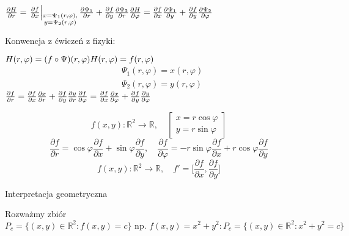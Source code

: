 \documentclass[../main.tex]{subfiles}
\begin{document}
$\frac{\partial H}{\partial r} = \left .\frac{\partial f}{\partial x} \right |_{\substack{x=\Psi_1(r,\varphi),\\y=\Psi_2(r,\varphi)}} \frac{\partial \Psi_1}{\partial r} + \frac{\partial f}{\partial y} \frac{\partial \Psi_2}{\partial r}\\
\frac{\partial H}{\partial \varphi} = \frac{\partial f}{\partial x} \frac{\partial \Psi_1}{\partial y} + \frac{\partial f}{\partial y} \frac{\partial \Psi_2}{\partial \varphi}$


\begin{large}
        Konwencja z ćwiczeń z fizyki:
\end{large}

$H(r,\varphi) = (f \circ \Psi)(r,\varphi)\\
H(r,\varphi)=f(r,\varphi)$
\begin{align*}&\Psi_1(r,\varphi)=x(r,\varphi)\\
              &\Psi_2(r,\varphi)=y(r,\varphi)\end{align*}
$\frac{\partial f}{\partial r} = \frac{\partial f}{\partial x} \frac{\partial x}{\partial r} + \frac{\partial f}{\partial y} \frac{\partial y}{\partial r}\\
\frac{\partial f}{\partial \varphi} = \frac{\partial f}{\partial x} \frac{\partial x}{\partial \varphi} + \frac{\partial f}{\partial y} \frac{\partial y}{\partial \varphi}$

\begin{przyklad}

\end{przyklad}
$$f(x,y):\mathbb{R}^2 \to \mathbb{R},\quad
\left [ \begin{matrix}
x=r\cos{\varphi}\\
y=r\sin{\varphi}\end{matrix}\right ]$$
$$\frac{\partial f}{\partial r} = \cos{\varphi} \frac{\partial f}{\partial x} + \sin{\varphi} \frac{\partial f}{\partial y},\quad
\frac{\partial f}{\partial \varphi} = -r\sin{\varphi} \frac{\partial f}{\partial x} + r\cos{\varphi} \frac{\partial f}{\partial y}$$
$$f(x,y):\mathbb{R}^2 \to \mathbb{R},\quad
f'= \Big [ \frac{\partial f}{\partial x} , \frac{\partial f}{\partial y} \Big ]$$

\begin{large}
    Interpretacja geometryczna
\end{large}
Rozważmy zbiór $$P_c = \{(x,y)\in \mathbb{R}^2 : f(x,y) = c \} \text{ np. } f(x,y) = x^2 + y^2 : P_c = \{(x,y)\in\mathbb{R}^2 : x^2+y^2 = c \}$$
\end{document}
